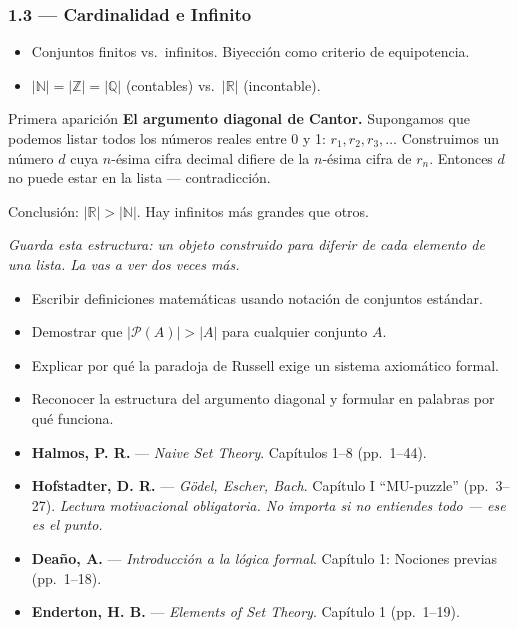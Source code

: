 \documentclass[11pt, letterpaper]{article}
\begin{document}
\subsubsection{1.3 --- Cardinalidad e Infinito}
\begin{itemize}
  \item Conjuntos finitos vs.\ infinitos. Biyecci\'on como criterio de equipotencia.
  \item $|\mathbb{N}|=|\mathbb{Z}|=|\mathbb{Q}|$ (contables) vs.\ $|\mathbb{R}|$ (incontable).
\end{itemize}

\begin{diagonal}{Primera aparici\'on}
\textbf{El argumento diagonal de Cantor.} Supongamos que podemos listar todos los n\'umeros reales entre 0 y 1: $r_1, r_2, r_3, \ldots$ Construimos un n\'umero $d$ cuya $n$-\'esima cifra decimal difiere de la $n$-\'esima cifra de $r_n$. Entonces $d$ no puede estar en la lista --- contradicci\'on.

\medskip
Conclusi\'on: $|\mathbb{R}|>|\mathbb{N}|$. Hay infinitos m\'as grandes que otros.

\medskip
\textit{Guarda esta estructura: un objeto construido para diferir de cada elemento de una lista. La vas a ver dos veces m\'as.}
\end{diagonal}

\begin{objetivos}
\begin{itemize}
  \item Escribir definiciones matem\'aticas usando notaci\'on de conjuntos est\'andar.
  \item Demostrar que $|\mathcal{P}(A)|>|A|$ para cualquier conjunto $A$.
  \item Explicar por qu\'e la paradoja de Russell exige un sistema axiom\'atico formal.
  \item Reconocer la estructura del argumento diagonal y formular en palabras por qu\'e funciona.
\end{itemize}
\end{objetivos}

\begin{lecturas}
\begin{itemize}
  \item[$(\star)$] \textbf{Halmos, P. R.} --- \emph{Naive Set Theory}. Cap\'itulos 1--8 (pp.\ 1--44).
  \item[$(\star)$] \textbf{Hofstadter, D. R.} --- \emph{G\"odel, Escher, Bach}. Cap\'itulo I ``MU-puzzle'' (pp.\ 3--27). \textit{Lectura motivacional obligatoria. No importa si no entiendes todo --- ese es el punto.}
  \item \textbf{Deaño, A.} --- \emph{Introducci\'on a la l\'ogica formal}. Cap\'itulo 1: Nociones previas (pp.\ 1--18).
  \item \textbf{Enderton, H. B.} --- \emph{Elements of Set Theory}. Cap\'itulo 1 (pp.\ 1--19).
\end{itemize}
\end{lecturas}
\end{document}
